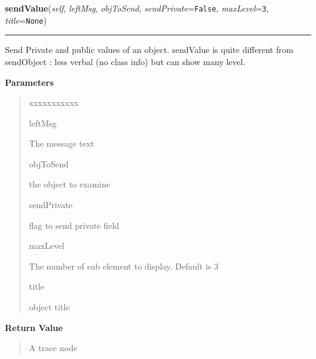 \hspace{.8\funcindent}\begin{boxedminipage}{\funcwidth}

    \raggedright \textbf{sendValue}(\textit{self}, \textit{leftMsg}, \textit{objToSend}, \textit{sendPrivate}={\tt False}, \textit{maxLevel}={\tt 3}, \textit{title}={\tt None})

    \vspace{-1.5ex}

    \rule{\textwidth}{0.5\fboxrule}
\setlength{\parskip}{2ex}
    Send Private and public values of an object. sendValue is quite 
    different from sendObject : less verbal (no class info) but can show 
    many level.

\setlength{\parskip}{1ex}
      \textbf{Parameters}
      \vspace{-1ex}

      \begin{quote}
        \begin{Ventry}{xxxxxxxxxxx}

          \item[leftMsg]

          The message text

          \item[objToSend]

          the object to examine

          \item[sendPrivate]

          flag to send private field

          \item[maxLevel]

          The number of sub element to display. Default is 3

          \item[title]

          object title

        \end{Ventry}

      \end{quote}

      \textbf{Return Value}
    \vspace{-1ex}

      \begin{quote}
      A trace node

      \end{quote}

    \end{boxedminipage}

